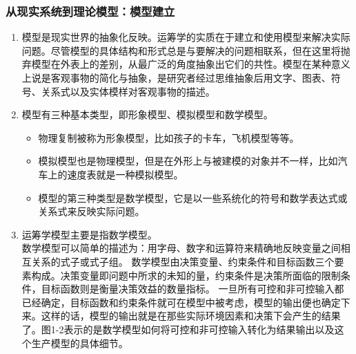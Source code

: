 \subsubsection{从现实系统到理论模型：模型建立}
\begin{frame}[allowframebreaks]{\subsubsecname}
\begin{enumerate}
    \item 模型是现实世界的抽象化反映。运筹学的实质在于建立和使用模型来解决实际问题。尽管模型的具体结构和形式总是与要解决的问题相联系，但在这里将抛弃模型在外表上的差别，从最广泛的角度抽象出它们的共性。模型在某种意义上说是客观事物的简化与抽象，是研究者经过思维抽象后用文字、图表、符号、关系式以及实体模样对客观事物的描述。
    \item 模型有三种基本类型，即形象模型、模拟模型和数学模型。
\begin{itemize}
    \item 物理复制被称为形象模型，比如孩子的卡车，飞机模型等等。
\item 模拟模型也是物理模型，但是在外形上与被建模的对象并不一样，比如汽车上的速度表就是一种模拟模型。
\item 模型的第三种类型是数学模型，它是以一些系统化的符号和数学表达式或关系式来反映实际问题。
\end{itemize}
\item 运筹学模型主要是指数学模型。\\
数学模型可以简单的描述为：用字母、数字和运算符来精确地反映变量之间相互关系的式子或式子组。
数学模型由决策变量、约束条件和目标函数三个要素构成。决策变量即问题中所求的未知的量，约束条件是决策所面临的限制条件，目标函数则是衡量决策效益的数量指标。
一旦所有可控和非可控输入都已经确定，目标函数和约束条件就可在模型中被考虑，模型的输出便也确定下来。这样的话，模型的输出就是在那些实际环境因素和决策下会产生的结果了。图1-2表示的是数学模型如何将可控和非可控输入转化为结果输出以及这个生产模型的具体细节。


\end{enumerate}
\end{frame}
